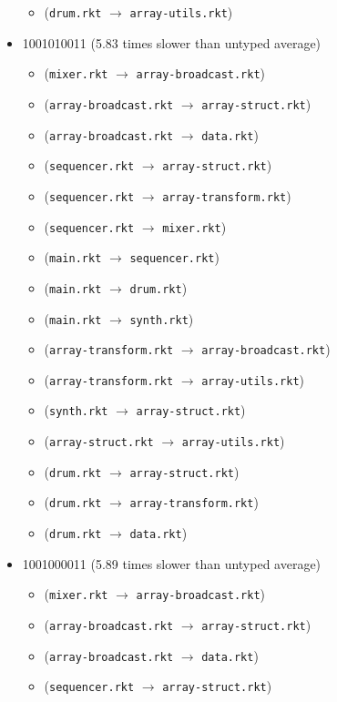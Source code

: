 \documentclass{article}
\newcommand{\mono}[1]{\texttt{#1}}
\begin{document}
\begin{itemize}
\begin{itemize}
  \item (\mono{drum.rkt} $\rightarrow$ \mono{array-utils.rkt})
  \end{itemize}
\item 1001010011 (5.83 times slower than untyped average)
  \begin{itemize}
  \item (\mono{mixer.rkt} $\rightarrow$ \mono{array-broadcast.rkt})
  \item (\mono{array-broadcast.rkt} $\rightarrow$ \mono{array-struct.rkt})
  \item (\mono{array-broadcast.rkt} $\rightarrow$ \mono{data.rkt})
  \item (\mono{sequencer.rkt} $\rightarrow$ \mono{array-struct.rkt})
  \item (\mono{sequencer.rkt} $\rightarrow$ \mono{array-transform.rkt})
  \item (\mono{sequencer.rkt} $\rightarrow$ \mono{mixer.rkt})
  \item (\mono{main.rkt} $\rightarrow$ \mono{sequencer.rkt})
  \item (\mono{main.rkt} $\rightarrow$ \mono{drum.rkt})
  \item (\mono{main.rkt} $\rightarrow$ \mono{synth.rkt})
  \item (\mono{array-transform.rkt} $\rightarrow$ \mono{array-broadcast.rkt})
  \item (\mono{array-transform.rkt} $\rightarrow$ \mono{array-utils.rkt})
  \item (\mono{synth.rkt} $\rightarrow$ \mono{array-struct.rkt})
  \item (\mono{array-struct.rkt} $\rightarrow$ \mono{array-utils.rkt})
  \item (\mono{drum.rkt} $\rightarrow$ \mono{array-struct.rkt})
  \item (\mono{drum.rkt} $\rightarrow$ \mono{array-transform.rkt})
  \item (\mono{drum.rkt} $\rightarrow$ \mono{data.rkt})
  \end{itemize}
\item 1001000011 (5.89 times slower than untyped average)
  \begin{itemize}
  \item (\mono{mixer.rkt} $\rightarrow$ \mono{array-broadcast.rkt})
  \item (\mono{array-broadcast.rkt} $\rightarrow$ \mono{array-struct.rkt})
  \item (\mono{array-broadcast.rkt} $\rightarrow$ \mono{data.rkt})
  \item (\mono{sequencer.rkt} $\rightarrow$ \mono{array-struct.rkt})

\end{itemize}
\end{itemize}
\end{document}
